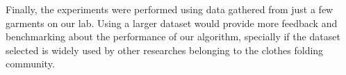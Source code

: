 Finally, the experiments were performed using data gathered from just a few garments on our lab. Using a larger dataset would provide more feedback and benchmarking about the performance of our algorithm, specially if the dataset selected is widely used by other researches belonging to the clothes folding community.

